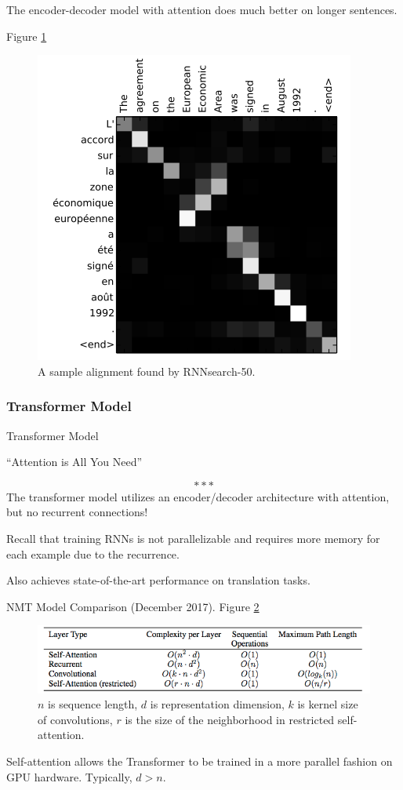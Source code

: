 \documentclass[english]{article}
\begin{document}
The encoder-decoder model with attention does much better on longer sentences.
 

\item  Figure \ref{A sample alignment found by RNNsearch-50}


\begin{figure}
\centering
\includegraphics[height=0.5\linewidth]{alignments.png}
\caption{A sample alignment found by RNNsearch-50.}
    \label{A sample alignment found by RNNsearch-50}
\end{figure}
 \eenum

\subsubsection{Transformer Model}
\benum
\item 
 {Transformer Model}

\begin{center}``Attention is All You Need''\end{center}
$$***$$
The transformer model utilizes an encoder/decoder architecture with attention, but no recurrent connections!
 
Recall that training RNNs is not parallelizable and requires more memory for each example due to the recurrence.
 
Also achieves state-of-the-art performance on translation tasks.
 



\item 
 {NMT Model Comparison (December 2017)}.  Figure \ref{NMT Model Comparison}

\begin{figure}
\centering
\includegraphics[height=0.15\linewidth]{nmt-compare3.png}
\caption{$n$ is sequence length, $d$ is representation dimension, $k$ is kernel size of convolutions, $r$ is the size of the neighborhood in restricted self-attention.}
    \label{NMT Model Comparison}
\end{figure}
Self-attention allows the Transformer to be trained in a more parallel fashion on GPU hardware. Typically, $d> n$.
 
\end{document}
